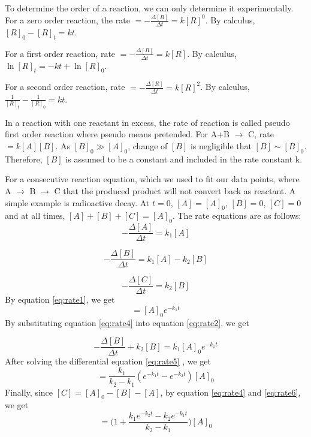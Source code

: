 To determine the order of a reaction, we can only determine it experimentally.
For a zero order reaction, the rate $ = - \frac{\Delta [R]}{\Delta t} = k[R]^0$. By calculus, $[R]_0 - [R]_t = kt$.

For a first order reaction, rate $ = - \frac{\Delta [R]}{\Delta t} = k[R]$. By calculus, $\ln [R]_t = -kt + \ln [R]_0$.

For a second order reaction, rate $ = - \frac{\Delta [R]}{\Delta t} = k[R]^2$. By calculus, $\frac{1}{[R]_t} - \frac{1}{[R]_0} = kt$.

In a reaction with one reactant in excess, the rate of reaction is called pseudo first order reaction where pseudo means pretended. For A+B $\rightarrow$ C, rate $ = k[A][B]$. As $[B]_0 \gg [A]_0$, change of $[B]$ is negligible that $[B] \sim [B]_0$. Therefore, $[B]$ is assumed to be a constant and included in the rate constant k.

For a consecutive reaction equation, which we used to fit our data points, where A $\rightarrow$ B $\rightarrow$ C that the produced product will not convert back as reactant. A simple example is radioactive decay. At $t=0$, $[A]=[A]_0$, $[B]=0$, $[C]=0$ and at all times, $[A]+[B]+[C]=[A]_0$. The rate equations are as follows:
\begin{equation}
- \frac{\Delta [A]}{\Delta t} = k_1 [A]
\label{eq:rate1}
\end{equation}

\begin{equation}
- \frac{\Delta [B]}{\Delta t} = k_1 [A] - k_2 [B]
\label{eq:rate2}
\end{equation}

\begin{equation}
- \frac{\Delta [C]}{\Delta t} = k_2 [B]
\label{eq:rate3}
\end{equation}
By equation \ref{eq:rate1}, we get
\begin{equation}
[A] = [A]_0 e^{-k_1 t}
\label{eq:rate4}
\end{equation}
By substituting equation \ref{eq:rate4} into equation \ref{eq:rate2}, we get

\begin{equation}
- \frac{\Delta [B]}{\Delta t} + k_2 [B] = k_1 [A]_0 e^{-k_1 t}
\label{eq:rate5}
\end{equation}
After solving the differential equation \ref{eq:rate5} , we get
\begin{equation}
[B] = \frac{k_1}{k_2 - k_1} (e^{-k_1 t} - e^{-k_2 t}) [A]_0
\label{eq:rate6}
\end{equation}
Finally, since $[C]=[A]_0 -[B]-[A]$, by equation \ref{eq:rate4} and \ref{eq:rate6}, we get
\begin{equation}
[C] = \Bigg( 1+ \frac{k_1 e^{-k_2 t} - k_2 e^{-k_1 t}}{k_2 - k_1} \Bigg) [A]_0
\label{eq:rate7}
\end{equation}
